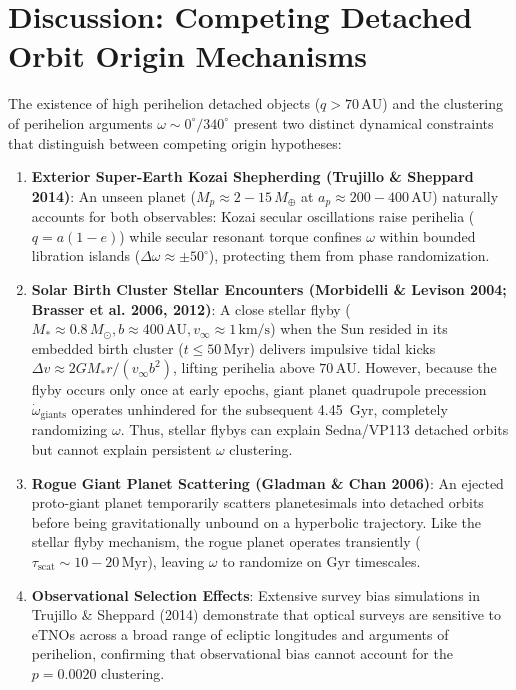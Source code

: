 \documentclass[11pt,a4paper]{article}
\begin{document}
\section{Discussion: Competing Detached Orbit Origin Mechanisms}
The existence of high perihelion detached objects ($q > 70\,\text{AU}$) and the clustering of perihelion arguments $\omega \sim 0^\circ / 340^\circ$ present two distinct dynamical constraints that distinguish between competing origin hypotheses:

\begin{enumerate}
    \item \textbf{Exterior Super-Earth Kozai Shepherding (Trujillo \& Sheppard 2014)}:
    An unseen planet ($M_p \approx 2 - 15\,M_\oplus$ at $a_p \approx 200 - 400\,\text{AU}$) naturally accounts for both observables: Kozai secular oscillations raise perihelia ($q = a(1-e)$) while secular resonant torque confines $\omega$ within bounded libration islands ($\Delta \omega \approx \pm 50^\circ$), protecting them from phase randomization.
    
    \item \textbf{Solar Birth Cluster Stellar Encounters (Morbidelli \& Levison 2004; Brasser et al. 2006, 2012)}:
    A close stellar flyby ($M_* \approx 0.8\,M_\odot, b \approx 400\,\text{AU}, v_\infty \approx 1\,\text{km/s}$) when the Sun resided in its embedded birth cluster ($t \le 50\,\text{Myr}$) delivers impulsive tidal kicks $\Delta v \approx 2 G M_* r / (v_\infty b^2)$, lifting perihelia above $70\,\text{AU}$. However, because the flyby occurs only once at early epochs, giant planet quadrupole precession $\dot{\omega}_{\text{giants}}$ operates unhindered for the subsequent 4.45~Gyr, completely randomizing $\omega$. Thus, stellar flybys can explain Sedna/VP113 detached orbits but cannot explain persistent $\omega$ clustering.
    
    \item \textbf{Rogue Giant Planet Scattering (Gladman \& Chan 2006)}:
    An ejected proto-giant planet temporarily scatters planetesimals into detached orbits before being gravitationally unbound on a hyperbolic trajectory. Like the stellar flyby mechanism, the rogue planet operates transiently ($\tau_{\text{scat}} \sim 10 - 20\,\text{Myr}$), leaving $\omega$ to randomize on Gyr timescales.
    
    \item \textbf{Observational Selection Effects}:
    Extensive survey bias simulations in Trujillo \& Sheppard (2014) demonstrate that optical surveys are sensitive to eTNOs across a broad range of ecliptic longitudes and arguments of perihelion, confirming that observational bias cannot account for the $p = 0.0020$ clustering.
\end{enumerate}
\end{document}
